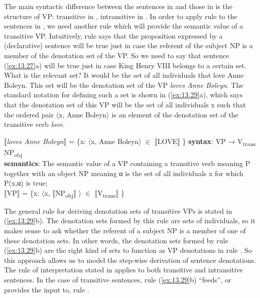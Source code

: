 The main syntactic difference between the sentences in  and those in  is the structure of VP: transitive in , intransitive in . In order to apply rule  to the sentences in , we need another rule which will provide the semantic value of a transitive VP. Intuitively, rule  says that the proposition expressed by a (declarative) sentence will be true just in case the referent of the subject NP is a member of the denotation set of the VP. So we need to say that sentence (\ref{ex:13.27}a) will be true just in case King Henry VIII belongs to a certain set. What is the relevant set? It would be the set of all individuals that love Anne Boleyn. This set will be the denotation set of the VP \textit{loves Anne Boleyn}. The standard notation for defining such a set is shown in (\ref{ex:13.29}a), which says that the denotation set of this VP will be the set of all individuals x such that the ordered pair $\langle$x, Anne Boleyn$\rangle$ is an element of the denotation set of the transitive verb \textit{love}.


\ea \label{ex:13.29}
\ea $\llbracket$\textit{loves Anne Boleyn}$\rrbracket$  = \{x: $\langle$x, Anne Boleyn$\rangle$ ${\in}$ $\llbracket$LOVE$\rrbracket$ \}
\ex \textbf{syntax}: VP  →  V\textsubscript{trans}  NP\textsubscript{obj}\\
\textbf{semantics}: The semantic value of a VP containing a transitive verb meaning P together with an object NP meaning α is the set of all individuals x for which P(x,α) is true;\\
{}$\llbracket$VP$\rrbracket$  =  \{x: $\langle$x, $\llbracket$NP\textsubscript{obj}$\rrbracket$ $\rangle$ ${\in}$ $\llbracket$V\textsubscript{trans}$\rrbracket$ \}
\z \z


The general rule for deriving denotation sets of transitive VPs is stated in (\ref{ex:13.29}b). The denotation sets formed by this rule are sets of individuals, so it makes sense to ask whether the referent of a subject NP is a member of one of these denotation sets. In other words, the denotation sets formed by rule (\ref{ex:13.29}b) are the right kind of sets to function as VP denotations in rule . So this approach allows us to model the step-wise derivation of sentence denotations. The rule of interpretation stated in  applies to both transitive and intransitive sentences. In the case of transitive sentences, rule (\ref{ex:13.29}b) “feeds”, or provides the input to, rule .



